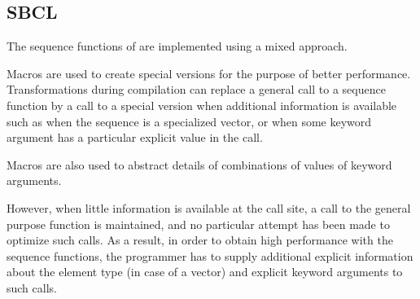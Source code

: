 \subsection{SBCL}

The sequence functions of \sbcl{} are implemented using a mixed
approach.

Macros are used to create special versions for the purpose of better
performance.  Transformations during compilation can replace a general
call to a sequence function by a call to a special version when
additional information is available such as when the sequence is a
specialized vector, or when some keyword argument has a particular
explicit value in the call.

Macros are also used to abstract details of combinations of values of
keyword arguments.

However, when little information is available at the call site, a call
to the general purpose function is maintained, and no particular
attempt has been made to optimize such calls.  As a result, in order
to obtain high performance with the \sbcl{} sequence functions, the
programmer has to supply additional explicit information about the
element type (in case of a vector) and explicit keyword arguments to
such calls.
